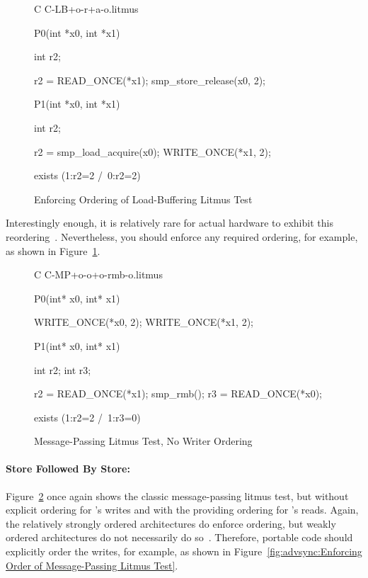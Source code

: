 \begin{figure}[tbp]
{ \scriptsize
\begin{verbbox}[\LstLineNo]
C C-LB+o-r+a-o.litmus
{
}

P0(int *x0, int *x1)
{
  int r2;

  r2 = READ_ONCE(*x1);
  smp_store_release(x0, 2);
}


P1(int *x0, int *x1)
{
  int r2;

  r2 = smp_load_acquire(x0);
  WRITE_ONCE(*x1, 2);
}

exists (1:r2=2 /\ 0:r2=2)
\end{verbbox}
}
\centering
\theverbbox
\caption{Enforcing Ordering of Load-Buffering Litmus Test}
\label{fig:advsync:Enforcing Ordering of Load-Buffering Litmus Test}
\end{figure}

Interestingly enough, it is relatively rare for actual hardware to
exhibit this reordering~\cite{LucMaranget2017aarch64}.
Nevertheless, you should enforce any required ordering, for example,
as shown in
Figure~\ref{fig:advsync:Enforcing Ordering of Load-Buffering Litmus Test}.

\begin{figure}[tbp]
{ \scriptsize
\begin{verbbox}[\LstLineNo]
C C-MP+o-o+o-rmb-o.litmus

{
}

P0(int* x0, int* x1) {

  WRITE_ONCE(*x0, 2);
  WRITE_ONCE(*x1, 2);

}

P1(int* x0, int* x1) {

  int r2;
  int r3;

  r2 = READ_ONCE(*x1);
  smp_rmb();
  r3 = READ_ONCE(*x0);

}

exists (1:r2=2 /\ 1:r3=0)
\end{verbbox}
}
\centering
\theverbbox
\caption{Message-Passing Litmus Test, No Writer Ordering}
\label{fig:advsync:Message-Passing Litmus Test, No Writer Ordering}
\end{figure}

\paragraph{Store Followed By Store:}
Figure~\ref{fig:advsync:Message-Passing Litmus Test, No Writer Ordering}
once again shows the classic message-passing litmus test, but without
explicit ordering for 's writes and with the 
providing ordering for 's reads.
Again, the relatively strongly ordered architectures do enforce ordering,
but weakly ordered architectures do not necessarily do
so~\cite{JadeAlglave2011ppcmem}.
Therefore, portable code should explicitly order the writes, for
example, as shown in
Figure~\ref{fig:advsync:Enforcing Order of Message-Passing Litmus Test}.

